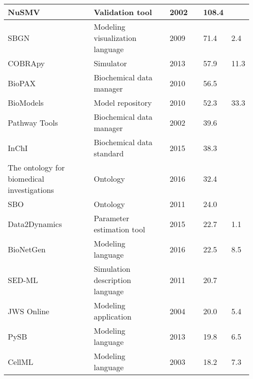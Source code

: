 \begin{longtable}{L{2.2cm}L{4cm}L{1cm}L{0.8cm}R{1.1cm}R{1cm}R{1cm}}
\midrule
\small{NuSMV} &\small{Validation tool} &\cite{Cimatti2002NuSMVChecking} &\small{2002} &\small{} &\small{108.4} &\small{}\\
\midrule
\small{SBGN} &\small{Modeling visualization language} &\cite{Novere2009TheNotation} &\small{2009} &\small{} &\small{71.4} &\small{2.4}\\
\midrule
\small{COBRApy} &\small{Simulator} &\cite{ebrahim2013cobrapy} &\small{2013} &\small{} &\small{57.9} &\small{11.3}\\
\midrule
\small{BioPAX} &\small{Biochemical data manager} &\cite{Demir2010TheSharing.} &\small{2010} &\small{} &\small{56.5} &\small{}\\
\midrule
\small{BioModels} &\small{Model repository} &\cite{Li2010BioModelsModelsb} &\small{2010} &\small{} &\small{52.3} &\small{33.3}\\
\midrule
\small{Pathway Tools} &\small{Biochemical data manager} &\cite{karp2002pathway} &\small{2002} &\small{} &\small{39.6} &\small{}\\
\midrule
\small{InChI} &\small{Biochemical data standard} &\cite{Heller2015InChIIdentifier.} &\small{2015} &\small{} &\small{38.3} &\small{}\\
\midrule
\small{The ontology for biomedical investigations} &\small{Ontology} &\cite{Bandrowski2016TheInvestigations} &\small{2016} &\small{} &\small{32.4} &\small{}\\
\midrule
\small{SBO} &\small{Ontology} &\cite{Courtot2011ControlledBiology.} &\small{2011} &\small{} &\small{24.0} &\small{}\\
\midrule
\small{Data2Dynamics} &\small{Parameter estimation tool} &\cite{Raue2015Data2Dynamics:Systems} &\small{2015} &\small{} &\small{22.7} &\small{1.1}\\
\midrule
\small{BioNetGen} &\small{Modeling language} &\cite{Harris2016BioNetGenModeling} &\small{2016} &\small{} &\small{22.5} &\small{8.5}\\
\midrule
\small{SED-ML} &\small{Simulation description language} &\cite{Waltemath2011ReproducibleLanguage} &\small{2011} &\small{} &\small{20.7} &\small{}\\
\midrule
\small{JWS Online} &\small{Modeling application} &\cite{Olivier2004Web-basedOnline} &\small{2004} &\small{} &\small{20.0} &\small{5.4}\\
\midrule
\small{PySB} &\small{Modeling language} &\cite{Lopez2013ProgrammingPySB} &\small{2013} &\small{} &\small{19.8} &\small{6.5}\\
\midrule
\small{CellML} &\small{Modeling language} &\cite{Cuellar2003AnLanguage} &\small{2003} &\small{} &\small{18.2} &\small{7.3}\\

\end{longtable}
